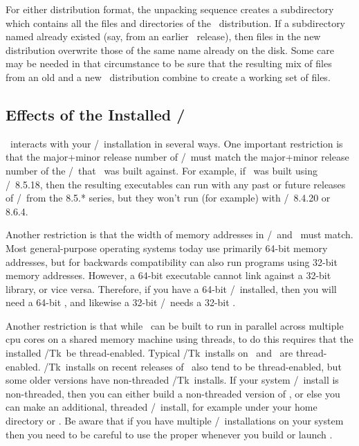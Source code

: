 For either distribution format, the unpacking sequence creates a
subdirectory  which contains all the files and directories
of the \OOMMF\ distribution.  If a subdirectory named 
already existed (say, from an earlier \OOMMF\ release), then
files in the new distribution overwrite those of the same name already
on the disk.  Some care may be needed in that circumstance to be
sure that the resulting mix of files from an old and a new
\OOMMF\ distribution combine to create a working set of files.

\subsection{Effects of the Installed \Tcl/\Tk}\label{sec:install.tcltk}
\OOMMF\ interacts with your \Tcl/\Tk\ installation in several ways.  One
important restriction is that the major+minor release number of
\Tcl/\Tk\ must match the major+minor release number of the \Tcl/\Tk\
that \OOMMF\ was built against.  For example, if \OOMMF\ was built using
\Tcl/\Tk\ 8.5.18, then the resulting executables can run with any past or
future releases of \Tcl/\Tk\ from the 8.5.* series, but they won't run
(for example) with \Tcl/\Tk\ 8.4.20 or 8.6.4.

Another restriction is that the width of memory addresses in \Tcl/\Tk\
and \OOMMF\ must match.  Most general-purpose operating systems today
use primarily 64-bit memory addresses, but for backwards compatibility
can also run programs using 32-bit memory addresses.  However, a 64-bit
executable cannot link against a 32-bit library, or vice versa.
Therefore, if you have a 64-bit \Tcl/\Tk\ installed, then you will need
a 64-bit \OOMMF, and likewise a 32-bit \Tcl/\Tk\ needs a 32-bit \OOMMF.

Another restriction is that while \OOMMF\ can be built to run in
parallel across multiple cpu cores on a shared memory machine using
threads, to do this requires that the installed \Tcl/Tk\ be
thread-enabled.  Typical \Tcl/Tk\ installs on \Windows\ and \MacOSX\ are
thread-enabled.  \Tcl/Tk\ installs on recent releases of \Unix\ also
tend to be thread-enabled, but some older versions have non-threaded
\Tcl/Tk\ installs.  If your system \Tcl/\Tk\ install is non-threaded,
then you can either build a non-threaded version of \OOMMF, or else you
can make an additional, threaded \Tcl/\Tk\ install, for example under
your home directory or \fn{/usr/local}.  Be aware that if you have
multiple \Tcl/\Tk\ installations on your system then you need to be
careful to use the proper \fn{tclsh} whenever you build or launch
\OOMMF.

